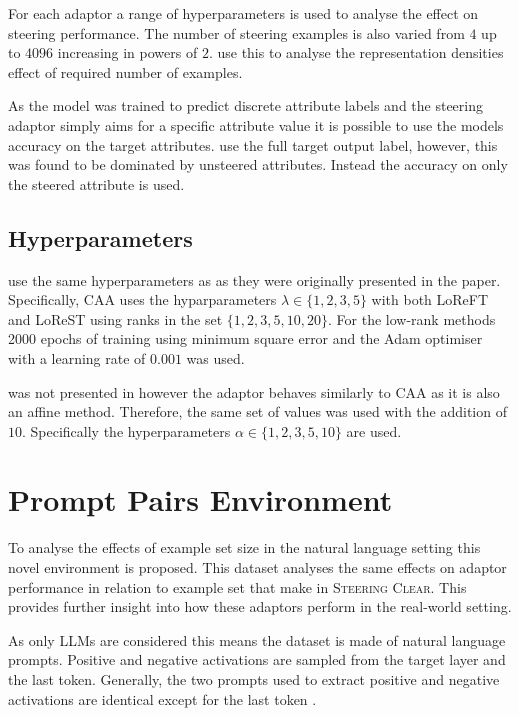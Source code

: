 For each adaptor a range of hyperparameters is used to analyse the effect on steering performance.
The number of steering examples is also varied from $4$ up to $4096$ increasing in powers of $2$.
\citet{steering-clear} use this to analyse the representation densities effect of required number of examples.

 As the model was trained to predict discrete attribute labels and the steering adaptor simply aims for a specific attribute value it is possible to use the models accuracy on the target attributes.
\citet{steering-clear} use the full target output label, however, this was found to be dominated by unsteered attributes.
Instead the accuracy on only the steered attribute is used.

\subsection{Hyperparameters}

 use the same hyperparameters as \citet{steering-clear} as they were originally presented in the paper.
Specifically, CAA uses the hyparparameters $\lambda \in \{1, 2, 3, 5\}$ with both LoReFT and LoReST using ranks in the set $\{1, 2, 3, 5, 10, 20\}$.
For the low-rank methods 2000 epochs of training using minimum square error and the Adam \cite{adam} optimiser with a learning rate of $0.001$ was used.

 was not presented in \citet{steering-clear} however the adaptor behaves similarly to CAA as it is also an affine method.
Therefore, the same set of values was used with the addition of $10$.
Specifically the hyperparameters $\alpha \in \{1, 2, 3, 5, 10\}$ are used.

\section{Prompt Pairs Environment}
\label{sec:prompt-pairs}

To analyse the effects of example set size in the natural language setting this novel environment is proposed.
This dataset analyses the same effects on adaptor performance in relation to example set that \citet{steering-clear} make in {\scshape Steering Clear}.
This provides further insight into how these adaptors perform in the real-world setting.

As only LLMs are considered this means the dataset is made of natural language prompts.
Positive and negative activations are sampled from the target layer and the last token.
Generally, the two prompts used to extract positive and negative activations are identical except for the last token \citep{steerability, icv, activation-addition}.


